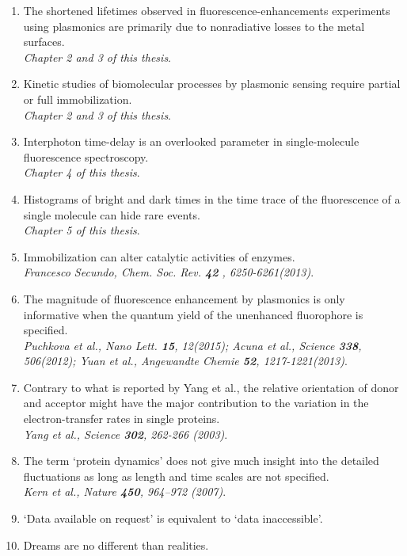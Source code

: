 \documentclass{dissertation}
\begin{document}
\newcommand{\refp}[1]{\\{\it \footnotesize #1}.}
\begin{enumerate}
	\item The shortened lifetimes observed in fluorescence-enhancements experiments using plasmonics are primarily due to nonradiative losses to the metal surfaces.
	\refp{Chapter 2 and 3 of this thesis}
	
	\item Kinetic studies of biomolecular processes by plasmonic sensing require partial or full immobilization. 
	\refp{Chapter 2 and 3 of this thesis}
	
	\item Interphoton time-delay is an overlooked parameter in single-molecule fluorescence spectroscopy.
	\refp{Chapter 4 of this thesis}
	
	\item Histograms of bright and dark times in the time trace of the fluorescence of a single molecule can hide rare events.
	\refp{Chapter 5 of this thesis}
	
	\item Immobilization can alter catalytic activities of enzymes.
	\refp{Francesco Secundo, Chem. Soc. Rev. \textbf{42} , 6250-6261(2013)}
	
	\item The magnitude of fluorescence enhancement by plasmonics is only informative when the quantum yield of the unenhanced fluorophore is specified.
	\refp{Puchkova et al., Nano Lett. \textbf{15}, 12(2015);
		  Acuna et al., Science \textbf{338}, 506(2012);
		  Yuan et al., Angewandte Chemie \textbf{52}, 1217-1221(2013)}
	
	\item Contrary to what is reported by Yang et al., the relative orientation of donor and acceptor might have the major contribution to the variation in the electron-transfer rates in single proteins.
	\refp{Yang et al., Science \textbf{302}, 262-266 (2003)}
	
	\item The term `protein dynamics' does not give much insight into the detailed fluctuations as long as length and time scales are not specified.
	\refp{Kern et al., Nature \textbf{450}, 964–972 (2007)}
	
	\item `Data available on request' is equivalent to `data inaccessible'.

	\item Dreams are no different than realities.
\end{enumerate}
\end{document}
